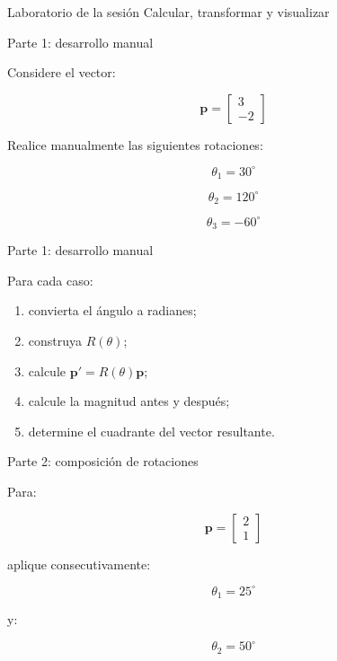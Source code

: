\documentclass[aspectratio=169]{beamer}
\begin{document}
\SectionSlide
{Laboratorio de la sesión}
{Calcular, transformar y visualizar}

\begin{frame}{Parte 1: desarrollo manual}

    Considere el vector:

    \[
    \mathbf{p}
    =
    \begin{bmatrix}
        3\\
        -2
    \end{bmatrix}
    \]

    Realice manualmente las siguientes rotaciones:

    \[
    \theta_1=30^\circ
    \]

    \[
    \theta_2=120^\circ
    \]

    \[
    \theta_3=-60^\circ
    \]

\end{frame}

\begin{frame}{Parte 1: desarrollo manual}

    Para cada caso:

    \begin{enumerate}
        \item convierta el ángulo a radianes;
        \item construya $R(\theta)$;
        \item calcule $\mathbf{p}'=R(\theta)\mathbf{p}$;
        \item calcule la magnitud antes y después;
        \item determine el cuadrante del vector resultante.
    \end{enumerate}

\end{frame}

\begin{frame}{Parte 2: composición de rotaciones}

    Para:

    \[
    \mathbf{p}
    =
    \begin{bmatrix}
        2\\
        1
    \end{bmatrix}
    \]

    aplique consecutivamente:

    \[
    \theta_1=25^\circ
    \]

    y:

    \[
    \theta_2=50^\circ
    \]

\end{frame}
\end{document}
